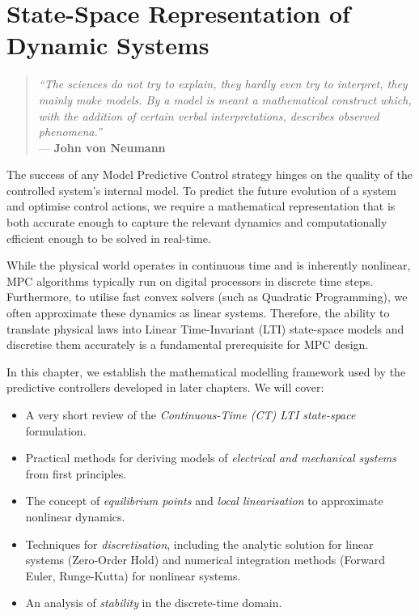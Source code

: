 \chapter{State-Space Representation of Dynamic Systems}
\label{chap:statespace}

\begin{quote}
	\textit{``The sciences do not try to explain, they hardly even try to interpret, they mainly make models. By a model is meant a mathematical construct which, with the addition of certain verbal interpretations, describes observed phenomena.''} \\
	\hfill --- \textbf{John von Neumann}
\end{quote}

The success of any Model Predictive Control strategy hinges on the quality of the controlled system's internal model. To predict the future evolution of a system and optimise control actions, we require a mathematical representation that is both accurate enough to capture the relevant dynamics and computationally efficient enough to be solved in real-time.

While the physical world operates in continuous time and is inherently nonlinear, MPC algorithms typically run on digital processors in discrete time steps. Furthermore, to utilise fast convex solvers (such as Quadratic Programming), we often approximate these dynamics as linear systems. Therefore, the ability to translate physical laws into Linear Time-Invariant (LTI) state-space models and discretise them accurately is a fundamental prerequisite for MPC design.

In this chapter, we establish the mathematical modelling framework used by the predictive controllers developed in later chapters. We will cover:
\begin{itemize}
	\item A very short review of the \emph{Continuous-Time (CT) LTI state-space} formulation.
	\item Practical methods for deriving models of \emph{electrical and mechanical systems} from first principles.
	\item The concept of \emph{equilibrium points} and \emph{local linearisation} to approximate nonlinear dynamics.
	\item Techniques for \emph{discretisation}, including the analytic solution for linear systems (Zero-Order Hold) and numerical integration methods (Forward Euler, Runge-Kutta) for nonlinear systems.
	\item An analysis of \emph{stability} in the discrete-time domain.
\end{itemize}

